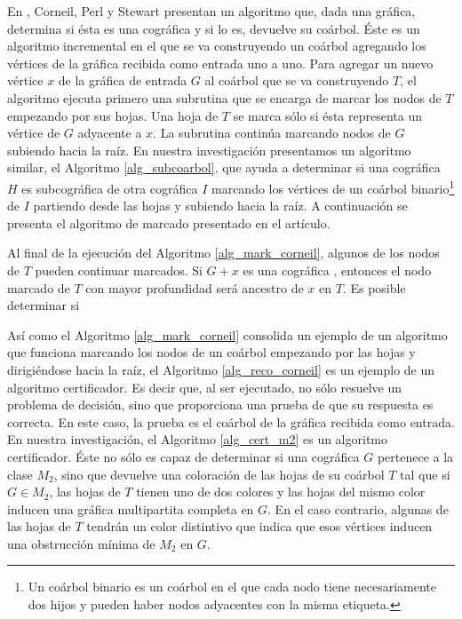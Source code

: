 En \cite{Corneil02}, Corneil, Perl y Stewart presentan un algoritmo que, 
dada una gráfica, determina si ésta es una cográfica y si lo es, devuelve
su coárbol. Éste es un algoritmo incremental en el que se va construyendo 
un coárbol agregando los vértices de la gráfica recibida como entrada uno 
a uno. Para agregar un nuevo vértice $x$ de la gráfica de entrada $G$ al 
coárbol que se va construyendo $T$, el algoritmo ejecuta primero una 
subrutina que se encarga de marcar los nodos de $T$ empezando por sus 
hojas. Una hoja de $T$ se marca sólo si ésta representa un vértice de $G$ 
adyacente a $x$. La subrutina continúa marcando nodos de $G$ subiendo hacia
la raíz. En nuestra investigación presentamos un algoritmo similar, el 
Algoritmo \ref{alg_subcoarbol}. que ayuda a determinar si una cográfica 
$H$ es subcográfica de otra cográfica $I$ marcando los vértices de un 
coárbol binario\footnote{Un coárbol binario es un coárbol en el que cada 
nodo tiene necesariamente dos hijos y pueden haber nodos adyacentes con la 
misma etiqueta.} de $I$ partiendo desde las hojas y subiendo hacia la raíz.
A continuación se presenta el algoritmo de marcado presentado en el artículo.


Al final de la ejecución del Algoritmo \ref{alg_mark_corneil}, algunos de los nodos de $T$ pueden continuar marcados. Si $G+x$ es una cográfica , entonces el nodo marcado de $T$ con mayor profundidad será ancestro de $x$ en $T$. Es posible determinar si 




Así como el Algoritmo \ref{alg_mark_corneil} consolida un ejemplo de un
algoritmo que funciona marcando los nodos de un coárbol empezando por las
hojas y dirigiéndose hacia la raíz, el Algoritmo \ref{alg_reco_corneil} es
un ejemplo de un algoritmo certificador. Es decir que, al ser ejecutado, no
sólo resuelve un problema de decisión, sino que proporciona una prueba de
que su respuesta es correcta. En este caso, la prueba es el coárbol de la
gráfica recibida como entrada. En nuestra investigación, el Algoritmo
\ref{alg_cert_m2} es un algoritmo certificador. Éste no sólo es capaz de
determinar si una cográfica $G$ pertenece a la clase $M_2$, sino que
devuelve una coloración de las hojas de su coárbol $T$ tal que si $G\in
M_2$, las hojas de $T$ tienen uno de dos colores y las hojas del mismo color
inducen una gráfica multipartita completa en $G$. En el caso contrario,
algunas de las hojas de $T$ tendrán un color distintivo que indica que esos
vértices inducen una obstrucción mínima de $M_2$ en $G$.


